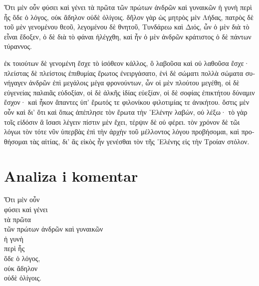 {\large
\begin{greek}
\noindent Ὅτι μὲν οὖν φύσει καὶ γένει τὰ πρῶτα τῶν πρώτων ἀνδρῶν καὶ γυναικῶν ἡ γυνὴ περὶ ἧς ὅδε ὁ λόγος, οὐκ ἄδηλον οὐδὲ ὀλίγοις. δῆλον γὰρ ὡς μητρὸς μὲν Λήδας, πατρὸς δὲ τοῦ μὲν γενομένου θεοῦ, λεγομένου δὲ θνητοῦ, Τυνδάρεω καὶ Διός, ὧν ὁ μὲν διὰ τὸ εἶναι ἔδοξεν, ὁ δὲ διὰ τὸ φάναι ἠλέγχθη, καὶ ἦν ὁ μὲν ἀνδρῶν κράτιστος ὁ δὲ πάντων τύραννος. 

ἐκ τοιούτων δὲ γενομένη ἔσχε τὸ ἰσόθεον κάλλος, ὃ λαβοῦσα καὶ οὐ λαθοῦσα ἔσχε· πλείστας δὲ πλείστοις ἐπιθυμίας ἔρωτος ἐνειργάσατο, ἑνὶ δὲ σώματι πολλὰ σώματα συνήγαγεν ἀνδρῶν ἐπὶ μεγάλοις μέγα φρονούντων, ὧν οἱ μὲν πλούτου μεγέθη, οἱ δὲ εὐγενείας παλαιᾶς εὐδοξίαν, οἱ δὲ ἀλκῆς ἰδίας εὐεξίαν, οἱ δὲ σοφίας ἐπικτήτου δύναμιν ἔσχον· καὶ ἧκον ἅπαντες ὑπ' ἔρωτός τε φιλονίκου φιλοτιμίας τε ἀνικήτου. ὅστις μὲν οὖν καὶ δι' ὅτι καὶ ὅπως ἀπέπλησε τὸν ἔρωτα τὴν ῾Ελένην λαβών, οὐ λέξω· τὸ γὰρ τοῖς εἰδόσιν ἃ ἴσασι λέγειν πίστιν μὲν ἔχει, τέρψιν δὲ οὐ φέρει. τὸν χρόνον δὲ τῶι λόγωι τὸν τότε νῦν ὑπερβὰς ἐπὶ τὴν ἀρχὴν τοῦ μέλλοντος λόγου προβήσομαι, καὶ προθήσομαι τὰς αἰτίας, δι' ἃς εἰκὸς ἦν γενέσθαι τὸν τῆς ῾Ελένης εἰς τὴν Τροίαν στόλον.

\end{greek}

}

\section*{Analiza i komentar}


{\large
\begin{greek}
\noindent Ὅτι μὲν οὖν \\
\tabto{2em} φύσει καὶ γένει \\
\tabto{2em} τὰ πρῶτα \\
\tabto{4em} τῶν πρώτων ἀνδρῶν καὶ γυναικῶν \\
ἡ γυνὴ \\
\tabto{2em} περὶ ἧς \\
\tabto{4em} ὅδε ὁ λόγος, \\
οὐκ ἄδηλον \\
\tabto{2em} οὐδὲ ὀλίγοις.\\

\end{greek}
}

